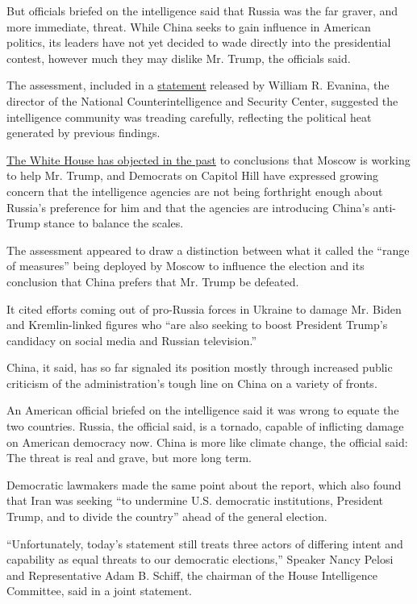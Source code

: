 But officials briefed on the intelligence said that Russia was the far
graver, and more immediate, threat. While China seeks to gain influence
in American politics, its leaders have not yet decided to wade directly
into the presidential contest, however much they may dislike Mr. Trump,
the officials said.

The assessment, included in a
\href{https://www.dni.gov/index.php/newsroom/press-releases/item/2139-statement-by-ncsc-director-william-evanina-election-threat-update-for-the-american-public}{statement}
released by William R. Evanina, the director of the National
Counterintelligence and Security Center, suggested the intelligence
community was treading carefully, reflecting the political heat
generated by previous findings.

\href{https://www.nytimes.com/2020/08/08/magazine/us-russia-intelligence.html?}{The
White House has objected in the past} to conclusions that Moscow is
working to help Mr. Trump, and Democrats on Capitol Hill have expressed
growing concern that the intelligence agencies are not being forthright
enough about Russia's preference for him and that the agencies are
introducing China's anti-Trump stance to balance the scales.

The assessment appeared to draw a distinction between what it called the
``range of measures'' being deployed by Moscow to influence the election
and its conclusion that China prefers that Mr. Trump be defeated.

It cited efforts coming out of pro-Russia forces in Ukraine to damage
Mr. Biden and Kremlin-linked figures who ``are also seeking to boost
President Trump's candidacy on social media and Russian television.''

China, it said, has so far signaled its position mostly through
increased public criticism of the administration's tough line on China
on a variety of fronts.

An American official briefed on the intelligence said it was wrong to
equate the two countries. Russia, the official said, is a tornado,
capable of inflicting damage on American democracy now. China is more
like climate change, the official said: The threat is real and grave,
but more long term.

Democratic lawmakers made the same point about the report, which also
found that Iran was seeking ``to undermine U.S. democratic institutions,
President Trump, and to divide the country'' ahead of the general
election.

``Unfortunately, today's statement still treats three actors of
differing intent and capability as equal threats to our democratic
elections,'' Speaker Nancy Pelosi and Representative Adam B. Schiff, the
chairman of the House Intelligence Committee, said in a joint statement.

